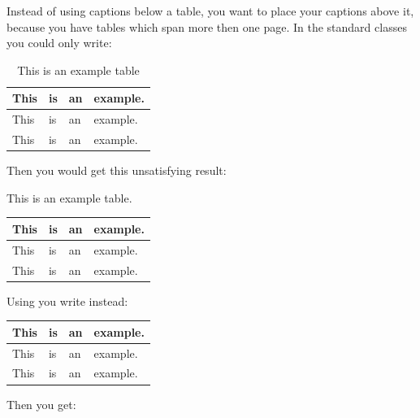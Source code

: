 \begin{Example}
  Instead of using captions below a table, you want to place your
  captions above it, because you have tables
  which span more then one page. In the standard classes you could
  only write:
\begin{lstcode}
  \begin{table}
    \caption{This is an example table}
    \begin{tabular}{llll}
      This & is & an & example.\\\hline
      This & is & an & example.\\
      This & is & an & example.
    \end{tabular}
  \end{table}
\end{lstcode}
  Then you would get this unsatisfying result:
  \begin{ShowOutput}\centering
    {
      This is an example table.}\\
        \begin{tabular}{llll}
      This & is & an & example.\\\hline
      This & is & an & example.\\
      This & is & an & example.
        \end{tabular}
\end{ShowOutput}
  Using {\KOMAScript} you write instead:
\begin{lstcode}
  \begin{table}
    \begin{tabular}{llll}
      This & is & an & example.\\\hline
      This & is & an & example.\\
      This & is & an & example.
    \end{tabular}
  \end{table}
\end{lstcode}
  Then you get:
\end{Example}
